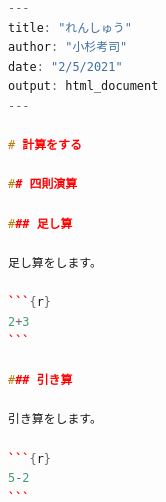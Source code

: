 \begin{lstlisting}[language=c++,label={code:05_08},caption={Rmarkdownを書いてみる}]
---
title: "れんしゅう"
author: "小杉考司"
date: "2/5/2021"
output: html_document
---

# 計算をする

## 四則演算

### 足し算

足し算をします。

```{r}
2+3
```

### 引き算

引き算をします。

```{r}
5-2
```
\end{lstlisting}
